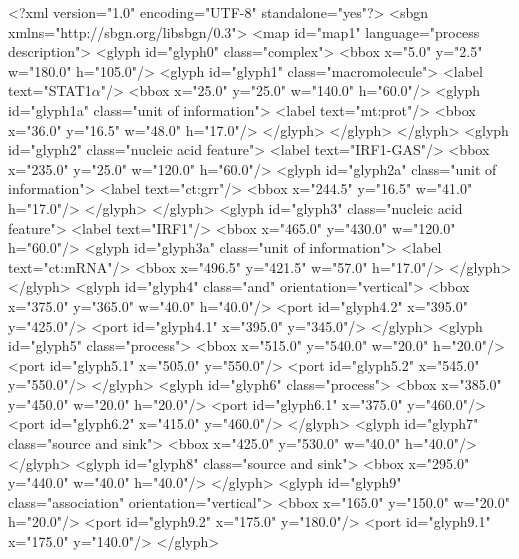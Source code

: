 \begin{example}
<?xml version="1.0" encoding="UTF-8" standalone="yes"?>
<sbgn xmlns="http://sbgn.org/libsbgn/0.3">
    <map id="map1" language="process description">
        <glyph id="glyph0" class="complex">
            <bbox x="5.0" y="2.5" w="180.0" h="105.0"/>
            <glyph id="glyph1" class="macromolecule">
                <label text="STAT1$\alpha$"/>
                <bbox x="25.0" y="25.0" w="140.0" h="60.0"/>
                <glyph id="glyph1a" class="unit of information">
                    <label text="mt:prot"/>
                    <bbox x="36.0" y="16.5" w="48.0" h="17.0"/>
                </glyph>
            </glyph>
        </glyph>
        <glyph id="glyph2" class="nucleic acid feature">
            <label text="IRF1-GAS"/>
            <bbox x="235.0" y="25.0" w="120.0" h="60.0"/>
            <glyph id="glyph2a" class="unit of information">
                <label text="ct:grr"/>
                <bbox x="244.5" y="16.5" w="41.0" h="17.0"/>
            </glyph>
        </glyph>
        <glyph id="glyph3" class="nucleic acid feature">
            <label text="IRF1"/>
            <bbox x="465.0" y="430.0" w="120.0" h="60.0"/>
            <glyph id="glyph3a" class="unit of information">
                <label text="ct:mRNA"/>
                <bbox x="496.5" y="421.5" w="57.0" h="17.0"/>
            </glyph>
        </glyph>
        <glyph id="glyph4" class="and" orientation="vertical">
            <bbox x="375.0" y="365.0" w="40.0" h="40.0"/>
            <port id="glyph4.2" x="395.0" y="425.0"/>
            <port id="glyph4.1" x="395.0" y="345.0"/>
        </glyph>
        <glyph id="glyph5" class="process">
            <bbox x="515.0" y="540.0" w="20.0" h="20.0"/>
            <port id="glyph5.1" x="505.0" y="550.0"/>
            <port id="glyph5.2" x="545.0" y="550.0"/>
        </glyph>
        <glyph id="glyph6" class="process">
            <bbox x="385.0" y="450.0" w="20.0" h="20.0"/>
            <port id="glyph6.1" x="375.0" y="460.0"/>
            <port id="glyph6.2" x="415.0" y="460.0"/>
        </glyph>
        <glyph id="glyph7" class="source and sink">
            <bbox x="425.0" y="530.0" w="40.0" h="40.0"/>
        </glyph>
        <glyph id="glyph8" class="source and sink">
            <bbox x="295.0" y="440.0" w="40.0" h="40.0"/>
        </glyph>
        <glyph id="glyph9" class="association" orientation="vertical">
            <bbox x="165.0" y="150.0" w="20.0" h="20.0"/>
            <port id="glyph9.2" x="175.0" y="180.0"/>
            <port id="glyph9.1" x="175.0" y="140.0"/>
        </glyph>

\end{example}
